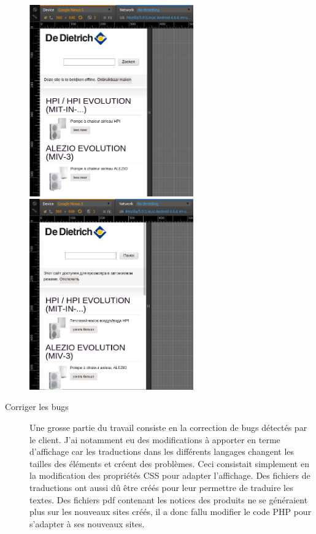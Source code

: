 \documentclass[a4paper,11pt,twoside]{report}
\begin{document}
\begin{description}
\begin{center}
	  \includegraphics[width=200pt]{images/DDTH_home_be_nl.png} 
	  \includegraphics[width=200pt]{images/DDTH_home_ru.png} 
	  \label{DDTH_home}
	\end{center}
	\item[Corriger les bugs] Une grosse partie du travail consiste en la correction de bugs détectés par le client. J'ai notamment eu des modifications à apporter en terme d'affichage car les traductions dans les différents langages changent les tailles des éléments et créent des problèmes. Ceci consistait simplement en la modification des propriétés CSS pour adapter l'affichage. Des fichiers de traductions ont aussi dû être créés pour leur permettre de traduire les textes. Des fichiers pdf contenant les notices des produits ne se généraient plus sur les nouveaux sites créés, il a donc fallu modifier le code PHP pour s'adapter à ses nouveaux sites. 

\end{description}
\end{document}
